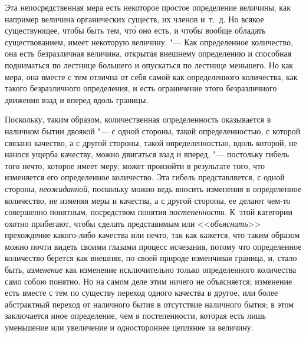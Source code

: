 Эта непосредственная мера есть некоторое простое определение величины, как
например величина органических существ, их членов и~т.~д. Но всякое
существующее, чтобы быть тем, чт\'{о} оно есть, и чтобы вообще обладать
существованием, имеет некоторую величину. "--- Как определенное количество, она
есть безразличная величина, открытая внешнему определению и способная
подниматься по лестнице большего и опускаться по лестнице меньшего. Но как
мера, она вместе с тем отлична от себя самой как определенного количества, как
такого безразличного определения, и есть ограничение этого безразличного
движения взад и вперед вдоль границы.

Поскольку, таким образом, количественная определенность оказывается в наличном
бытии двоякой "--- с одной стороны, такой определенностью, с которой связано
качество, а с другой стороны, такой определенностью, вдоль которой, не нанося
ущерба качеству, можно двигаться взад и вперед, "--- постольку гибель того
нечто, которое имеет меру, может произойти в результате того, что изменяется
его определенное количество. Эта гибель представляется, с одной стороны,
{\em неожиданной}, поскольку можно ведь вносить изменения в определенное
количество, не изменяя меры и качества, а с другой стороны, ее делают чем-то
совершенно понятным, посредством понятия {\em постепенности}. К~этой категории
охотно прибегают, чтобы сделать представимым или <<{\em объяснить}>>
прехождение какого-либо качества или нечто, так как кажется, что таким образом
можно почти видеть своими глазами процесс исчезания, потому что определенное
количество берется как внешняя, по своей природе изменчивая граница, и, стало
быть, {\em изменение} как изменение исключительно только определенного
количества само собою понятно. Но на самом деле этим ничего не объясняется;
изменение есть вместе с тем по существу переход одного качества в другое, или
более абстрактный переход от наличного бытия в отсутствие наличного бытия; в
этом заключается иное определение, чем в постепенности, которая есть лишь
уменьшение или увеличение и одностороннее цепляние за величину.

